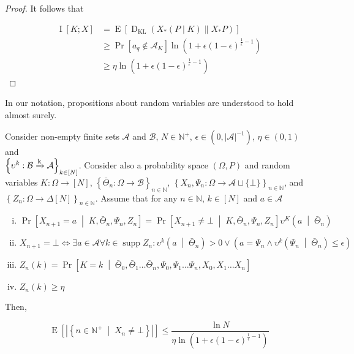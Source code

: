 \documentclass[anon,12pt]{colt2018} %
\DeclareMathOperator{\Supp}{supp}
\newcommand{\AP}[1]{\left(#1\right)}
\newcommand{\AB}[1]{\left[#1\right]}
\newcommand{\AC}[1]{\left\{#1\right\}}
\newcommand{\APM}[2]{\left(#1\;\middle\vert\;#2\right)}
\newcommand{\ABM}[2]{\left[#1\;\middle\vert\;#2\right]}
\newcommand{\ACM}[2]{\left\{#1\;\middle\vert\;#2\right\}}
\newcommand{\Pa}[2]{\underset{#1}{\operatorname{Pr}}\AB{#2}}
\newcommand{\CP}[3]{\underset{#1}{\operatorname{Pr}}\ABM{#2}{#3}}
\newcommand{\Ea}[2]{\underset{#1}{\operatorname{E}}\AB{#2}}
\newcommand{\Ia}[2]{\underset{#1}{\operatorname{I}}\AB{#2}}
\newcommand{\KL}[2]{\operatorname{D}_{\mathrm{KL}}(#1 \| #2)}
\newcommand{\Nats}{\mathbb{N}}
\newcommand{\Abs}[1]{\left\vert #1 \right\vert}
\newcommand{\K}{\xrightarrow{\textnormal{k}}}
\newcommand{\A}{\mathcal{A}}
\newcommand{\Ad}{\upsilon}
\newcommand{\B}{\mathcal{B}}
\begin{document}
\begin{proof}
It follows that

\begin{align*}
\Ia{}{K;X} &= \Ea{}{\KL{X_*(P \mid K)}{X_*P}} \\ 
&\geq \Pa{}{a_q \not \in \A_K} \ln{\AP{1+\epsilon(1-\epsilon)^{\frac{1}{\epsilon}-1}}} \\
&\geq \eta \ln{\AP{1+\epsilon(1-\epsilon)^{\frac{1}{\epsilon}-1}}}
\end{align*}
\end{proof}

In our notation, propositions about random variables are understood to hold almost surely.

\begin{samepage}
\begin{proposition}
\label{prp:delegation}

Consider non-empty finite sets $\A$ and $\B$, $N \in \Nats^+$, $\epsilon\in\AP{0,\Abs{\A}^{-1}}$, $\eta\in(0,1)$ and\\ $\AC{\Ad^k: \B \K \A}_{k\in[N]}$. Consider also  a probability space $(\Omega,P)$ and random variables $K: \Omega \rightarrow [N]$, $\AC{\bar{\Theta}_n: \Omega \rightarrow \B}_{n\in\Nats}$, $\AC{X_n,\Psi_n: \Omega \rightarrow \A \sqcup \{\bot\}}_{n \in \Nats}$, and $\AC{Z_n: \Omega \rightarrow \Delta[N]}_{n \in \Nats}$. Assume that for any $n\in\Nats$, $k\in[N]$ and $a\in\A$

\begin{enumerate}[i.]

\item\label{con:prp__delegation__xa} $\CP{}{X_{n+1} = a}{K,\bar{\Theta}_n,\Psi_n,Z_n}=\CP{}{X_{n+1}\ne\bot}{K,\bar{\Theta}_n,\Psi_n,Z_n} \Ad^K\APM{a}{\bar{\Theta}_n}$
\item\label{con:prp__delegation__xbot} $X_{n+1} = \bot \iff \exists a \in \A \forall k \in \Supp{Z_n}: \Ad^k\APM{a}{\bar{\Theta}_n} > 0 \lor \AP{a=\Psi_n \land \Ad^k\APM{\Psi_n}{\bar{\Theta}_n} \leq \epsilon}$
\item\label{con:prp__delegation__z} $Z_n(k)=\CP{}{K = k}{\bar{\Theta}_0,\bar{\Theta}_1\dots\bar{\Theta}_{n},\Psi_0,\Psi_1\dots\Psi_n,X_0,X_1 \dots X_{n}}$
\item\label{con:prp__delegation__eta} $Z_n(k) \geq \eta$

\end{enumerate}

Then,

\begin{equation}
\Ea{}{\Abs{\ACM{n\in\Nats^+}{X_n\ne\bot}}} \leq \frac{\ln{N}}{\eta\ln{\AP{1+\epsilon(1-\epsilon)^{\frac{1}{\epsilon}-1}}}}
\end{equation}

\end{proposition}
\end{samepage}
\end{document}
